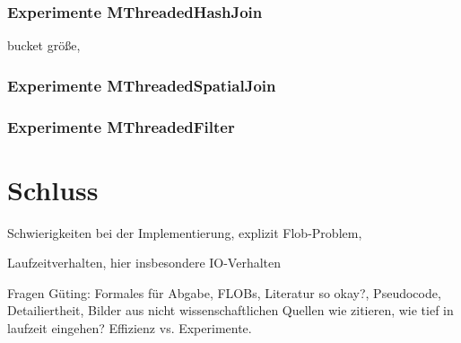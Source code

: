 \documentclass[a4paper,12pt,twoside]{article}
\begin{document}
\subsubsection{Experimente MThreadedHashJoin}

bucket größe, 

\subsubsection{Experimente MThreadedSpatialJoin}

\subsubsection{Experimente MThreadedFilter}

\section{Schluss}

Schwierigkeiten bei der Implementierung, explizit Flob-Problem,

Laufzeitverhalten, hier insbesondere IO-Verhalten

Fragen Güting:
Formales für Abgabe, FLOBs, Literatur so okay?, Pseudocode, Detailiertheit, Bilder aus nicht wissenschaftlichen Quellen wie zitieren, wie tief in laufzeit eingehen? Effizienz vs. Experimente. 

\pagebreak 
\printbibliography
\end{document}
